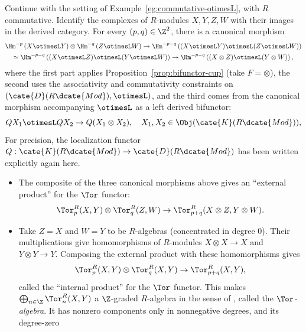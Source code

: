 \begin{example}
	Continue with the setting of Example~\ref{eg:commutative-otimesL}, with $R$
	commutative. Identify the complexes of $R$-modules $X,Y,Z,W$ with their
	images in the derived category. For every $(p,q)\in\Z^2$, there is a
	canonical morphism
	\begin{multline*}
		\Hm^{-p}\left( X \otimesL Y \right) \otimes \Hm^{-q}\left( Z \otimesL W \right) \to \Hm^{-p-q}\left( (X \otimesL Y) \otimesL (Z \otimesL W) \right) \\
		\simeq \Hm^{-p-q}\left( (X \otimesL Z) \otimesL (Y \otimesL W) \right) \to \Hm^{-p-q} \left( (X \otimes Z) \otimesL (Y \otimes W) \right),
	\end{multline*}
	where the first part applies Proposition~\ref{prop:bifunctor-cup} (take
	$F=\otimes$), the second uses the associativity and commutativity constraints
	on $(\cate{D}(R\dcate{Mod}),\otimesL)$, and the third comes from the
	canonical morphism accompanying $\otimesL$ as a left derived bifunctor:
	\[ QX_1 \otimesL QX_2 \to Q(X_1 \otimes X_2), \quad X_1, X_2 \in \Obj(\cate{K}(R\dcate{Mod})), \]
	For precision, the localization functor
	$Q:\cate{K}(R\dcate{Mod})\to\cate{D}(R\dcate{Mod})$ has been written
	explicitly again here.
	\begin{itemize}
		\item The composite of the three canonical morphisms above gives an
		``external product'' for the $\Tor$ functor:
		\[ \Tor^R_p(X, Y) \otimes \Tor^R_q(Z, W) \to \Tor^R_{p+q}(X \otimes Z, Y \otimes W). \]
		\item Take $Z=X$ and $W=Y$ to be $R$-algebras (concentrated in degree
		$0$). Their multiplications give homomorphisms of $R$-modules
		$X\otimes X\to X$ and $Y\otimes Y\to Y$. Composing the external product
		with these homomorphisms gives
		\[ \Tor^R_p(X, Y) \otimes \Tor^R_q(X, Y) \to \Tor^R_{p+q}(X,Y), \]
		called the ``internal product'' for the $\Tor$ functor. This makes
		$\bigoplus_{n \in \Z} \Tor^R_n(X, Y)$ a $\Z$-graded $R$-algebra in the
		sense of \cite[Definition 7.4.1]{Li1}, called the \emph{$\Tor$-algebra}.
		It has nonzero components only in nonnegative degrees, and its degree-zero

\end{itemize}
\end{example}
